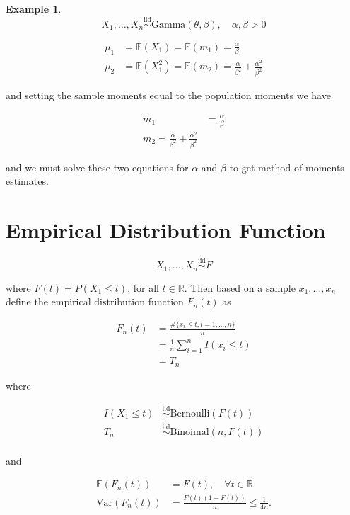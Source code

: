 \documentclass[12pt]{article}
\theoremstyle{definition}
\newtheorem*{example}{Example}
\begin{document}
\begin{example}
$$ X_1, \ldots, X_n \overset{\text{iid}}{\sim} \text{Gamma}(\theta, \beta), \quad \alpha, \beta > 0$$

\begin{align*}
\mu_1 &= \mathbb{E}(X_1) = \mathbb{E}(m_1) = \frac{\alpha}{\beta} \\
\mu_2 &= \mathbb{E}(X_1^2) = \mathbb{E}(m_2) = \frac{\alpha}{\beta^2} + \frac{\alpha^2}{\beta^2}
\end{align*}

and setting the sample moments equal to the population moments we have

\begin{align*}
m_1 &= \frac{\alpha}{\beta} \\
m_2 = \frac{\alpha}{\beta^2} + \frac{\alpha^2}{\beta^2}
\end{align*}

and we must solve these two equations for $\alpha$ and $\beta$ to
get method of moments estimates.

\end{example}


\section{Empirical Distribution Function}

$$ X_1, \ldots, X_n \overset{\text{iid}}{\sim} F$$ 

where $F(t) = P(X_1 \leq t)$, for all $t \in \mathbb{R}$. Then based on
a sample $x_1, \ldots, x_n$ define the empirical distribution function $F_n(t)$
as

\begin{align*}
F_n(t) &= \frac{\# \{x_i \leq t, i = 1, \ldots, n \}}{n} \\
&= \frac{1}{n} \sum_{i = 1}^n I(x_i \leq t) \\
&= T_n
\end{align*}

where

\begin{align*}
I(X_1 \leq t) &\overset{\text{iid}}{\sim} \text{Bernoulli}(F(t)) \\
T_n &\overset{\text{iid}}{\sim} \text{Binoimal}(n, F(t)) \\
\end{align*}

and

\begin{align*}
\mathbb{E}(F_n(t)) &= F(t), \quad \forall t \in \mathbb{R} \\
\text{Var}(F_n(t)) &= \frac{F(t)(1-F(t))}{n} \leq \frac{1}{4n}.
\end{align*}
\end{document}
